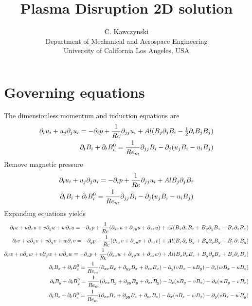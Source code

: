 \documentclass[11pt]{article}
\begin{document}
\doublespacing
\title{Plasma Disruption 2D solution}
\author{C. Kawczynski \\
Department of Mechanical and Aerospace Engineering \\
University of California Los Angeles, USA\\
}
\maketitle

\section{Governing equations}
The dimensionless momentum and induction equations are
\begin{equation}\begin{aligned}
\partial_t u_i+u_j\partial_j u_i = -\partial_i p+ \frac{1}{Re} \partial_{jj} u_i + Al (B_j \partial_j B_i - \tfrac{1}{2} \partial_i B_j B_j) \\
\partial_t B_i + \partial_t B_i^0 = \frac{1}{Re_m} \partial_{jj} B_i - \partial_j (u_j B_i - u_i B_j)
\end{aligned} \end{equation}
Remove magnetic pressure
\begin{equation}\begin{aligned}
\partial_t u_i+u_j\partial_j u_i = -\partial_i p+ \frac{1}{Re} \partial_{jj} u_i + Al B_j \partial_j B_i \\
\partial_t B_i + \partial_t B_i^0 = \frac{1}{Re_m} \partial_{jj} B_i - \partial_j (u_j B_i - u_i B_j)
\end{aligned} \end{equation}
Expanding equations yields
\begin{equation}\begin{aligned}
\partial_t u+ u\partial_x u + v\partial_y u + w\partial_z u = -\partial_x p+ \frac{1}{Re} (\partial_{xx} u+\partial_{yy} u+\partial_{zz} u) + Al (B_x \partial_x B_x + B_y \partial_y B_x + B_z \partial_z B_x) \\
\partial_t v+ u\partial_x v + v\partial_y v + w\partial_z v = -\partial_y p+ \frac{1}{Re} (\partial_{xx} v+\partial_{yy} v+\partial_{zz} v) + Al (B_x \partial_x B_y + B_y \partial_y B_y + B_z \partial_z B_y) \\
\partial_t w+ u\partial_x w + v\partial_y w + w\partial_z w = -\partial_z p+ \frac{1}{Re} (\partial_{xx} w+\partial_{yy} w+\partial_{zz} w) + Al (B_x \partial_x B_z + B_y \partial_y B_z + B_z \partial_z B_z) \\
\partial_t B_x + \partial_t B_x^0 = \frac{1}{Re_m} (\partial_{xx} B_x + \partial_{yy} B_x+\partial_{zz} B_x)                         - \partial_y (v B_x - u B_y) - \partial_z (w B_x - u B_z) \\
\partial_t B_y + \partial_t B_y^0 = \frac{1}{Re_m} (\partial_{xx} B_y + \partial_{yy} B_y+\partial_{zz} B_y) - \partial_x (u B_y - v B_x)                         - \partial_z (w B_y - v B_z) \\
\partial_t B_z + \partial_t B_z^0 = \frac{1}{Re_m} (\partial_{xx} B_z + \partial_{yy} B_z+\partial_{zz} B_z) - \partial_x (u B_z - w B_x) - \partial_y (v B_z - w B_y)                         \\
\end{aligned} \end{equation}
\end{document}
